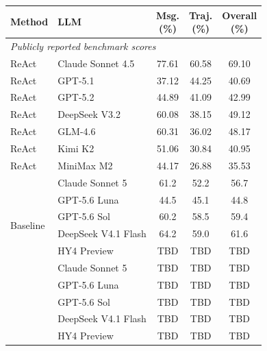\documentclass{article}
\newcommand{\method}{\textsc{CARE}}
\newcommand{\headpct}{(\%)}
\newcommand{\tabpubliclyreported}[1]{%
  \multicolumn{#1}{l}{\textit{Publicly reported benchmark scores}}\\%
}
\begin{document}
\begin{table}[t]
  \centering
  \begin{minipage}[t]{0.48\textwidth}
    \centering
    \label{tab:ddr-matrix}
    \scriptsize
    \setlength{\tabcolsep}{2.5pt}
    \begin{tabular}{llccc}
      \toprule
      Method & LLM & \makecell{Msg.\\\headpct} & \makecell{Traj.\\\headpct} & \makecell{Overall\\\headpct} \\
      \midrule
      \tabpubliclyreported{5}
      ReAct & Claude Sonnet 4.5 & 77.61 & 60.58 & 69.10 \\
      ReAct & GPT-5.1 & 37.12 & 44.25 & 40.69 \\
      ReAct & GPT-5.2 & 44.89 & 41.09 & 42.99 \\
      ReAct & DeepSeek V3.2 & 60.08 & 38.15 & 49.12 \\
      ReAct & GLM-4.6 & 60.31 & 36.02 & 48.17 \\
      ReAct & Kimi K2 & 51.06 & 30.84 & 40.95 \\
      ReAct & MiniMax M2 & 44.17 & 26.88 & 35.53 \\
      \midrule
      \multirow{6}{*}{Baseline}
        & Claude Sonnet 5 & 61.2 & 52.2 & 56.7 \\
        & GPT-5.6 Luna & 44.5 & 45.1 & 44.8 \\
        & GPT-5.6 Sol & 60.2 & 58.5 & 59.4 \\
        & DeepSeek V4.1 Flash & 64.2 & 59.0 & 61.6 \\
        & HY4 Preview & TBD & TBD & TBD \\
      \midrule
      \multirow{6}{*}{\method{}}
        & Claude Sonnet 5 & TBD & TBD & TBD \\
        & GPT-5.6 Luna & TBD & TBD & TBD \\
        & GPT-5.6 Sol & TBD & TBD & TBD \\
        & DeepSeek V4.1 Flash & TBD & TBD & TBD \\
        & HY4 Preview & TBD & TBD & TBD \\
      \bottomrule
    \end{tabular}
  \end{minipage}\hfill

\end{table}
\end{document}
